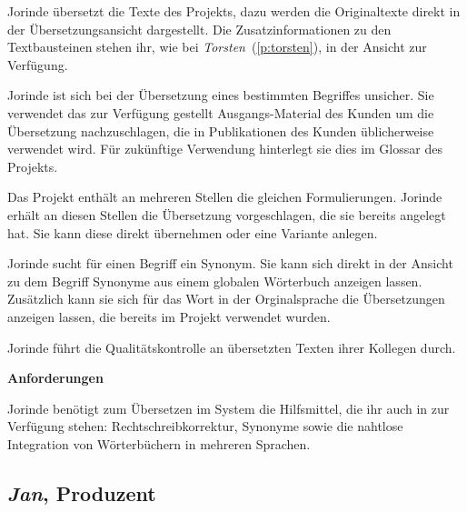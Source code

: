 \begin{multicols}{2}
Jorinde übersetzt die Texte des Projekts, dazu werden die Originaltexte direkt in der Übersetzungsansicht dargestellt. Die Zusatzinformationen zu den Textbausteinen stehen ihr, wie bei \emph{Torsten}~(\ref{p:torsten}), in der Ansicht zur Verfügung.

Jorinde ist sich bei der Übersetzung eines bestimmten Begriffes unsicher. Sie verwendet das zur Verfügung gestellt Ausgangs-Material des Kunden um die Übersetzung nachzuschlagen, die in Publikationen des Kunden üblicherweise verwendet wird. Für zukünftige Verwendung hinterlegt sie dies im Glossar des Projekts.

Das Projekt enthält an mehreren Stellen die gleichen Formulierungen. Jorinde erhält an diesen Stellen die Übersetzung vorgeschlagen, die sie bereits angelegt hat. Sie kann diese direkt übernehmen oder eine Variante anlegen.

Jorinde sucht für einen Begriff ein Synonym. Sie kann sich direkt in der Ansicht zu dem Begriff Synonyme aus einem globalen Wörterbuch anzeigen lassen. Zusätzlich kann sie sich für das Wort in der Orginalsprache die Übersetzungen anzeigen lassen, die bereits im Projekt verwendet wurden.

Jorinde führt die Qualitätskontrolle an übersetzten Texten ihrer Kollegen durch.

\textbf{Anforderungen}

Jorinde benötigt zum Übersetzen im System die Hilfsmittel, die ihr auch in  zur Verfügung stehen: Rechtschreibkorrektur, Synonyme sowie die nahtlose Integration von Wörterbüchern in mehreren Sprachen.

\end{multicols}

\pagebreak

\subsection{\emph{Jan}, Produzent}\label{p:jan}

